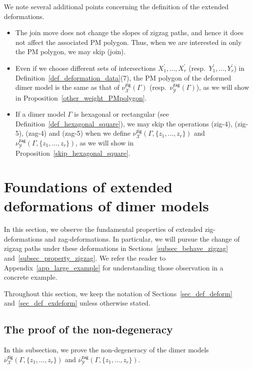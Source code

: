 \documentclass[pdftex]{sigma}%
\numberwithin{equation}{section}
\numberwithin{figure}{section}
\numberwithin{table}{section}
\newcommand{\calX}{\mathcal{X}}
\newcommand{\calY}{\mathcal{Y}}
\newcommand{\zig}{\mathsf{zig}}
\newcommand{\zag}{\mathsf{zag}}
\begin{document}
\begin{Remark}\label{rem_def_deform}
We note several additional points concerning the definition of the extended deformations.
\begin{itemize}\itemsep=0pt
\item[(1)] The join move does not change the slopes of zigzag paths, and hence it does not affect the associated PM polygon.
Thus, when we are interested in only the PM polygon, we may skip (join).
\item[(2)]
Even if we choose different sets of intersections $X_1^\prime,\dots,X_r^\prime$ (resp.~$Y_1^\prime,\dots,Y_r^\prime$) in Definition~\ref{def_deformation_data}(7),
the PM polygon of the deformed dimer model is the same as that of $\nu^\zig_\calX(\Gamma)$ (resp.~$\nu^\zag_\calY(\Gamma)$), as we will show in Proposition~\ref{other_weight_PMpolygon}.
\item[(3)] If a dimer model $\Gamma$ is hexagonal or rectangular (see Definition~\ref{def_hexagonal_square}),
we may skip the operations (zig-4), (zig-5), (zag-4) and (zag-5) when we define $\nu^\zig_\calX(\Gamma, \{z_1,\dots,z_r\})$ and $\nu^\zag_\calY(\Gamma, \{z_1,\dots,z_r\})$, as we will show in Proposition~\ref{skip_hexagonal_square}.
\end{itemize}
\end{Remark}

\section{Foundations of extended deformations of dimer models}\label{sec_proof}

In this section, we observe the fundamental properties of extended zig-deformations and zag-deformations.
In particular, we will pursue the change of zigzag paths under these deformations
in Sections~\ref{subsec_behave_zigzag} and~\ref{subsec_property_zigzag}.
We refer the reader to Appendix~\ref{app_large_example} for understanding those observation in a concrete example.

Throughout this section, we keep the notation of Sections~\ref{sec_def_deform} and~\ref{sec_def_exdeform} unless otherwise stated.

\subsection{The proof of the non-degeneracy}\label{subsec_nondegenerate_deformation}

In this subsection, we prove the non-degeneracy of the dimer models $\overline{\nu}^\zig_\calX(\Gamma, \{z_1,\dots,z_r\})$ and $\overline{\nu}^\zag_\calY(\Gamma, \{z_1,\dots,z_r\})$.
\end{document}
